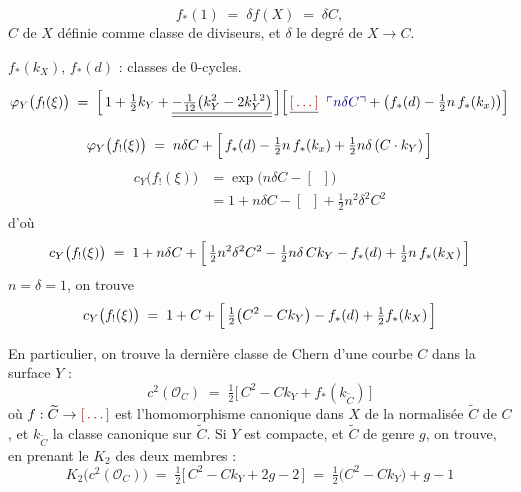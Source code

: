 \documentclass[11pt,a4paper]{article}
\begin{document}
\[
  f_{*}(1) \;=\; \delta f(X) \;=\; \delta C ,
\]
\struck{\ill{}} $C$   de $X$ \ill{} définie
comme classe de diviseurs, et $\delta$ le degré de $X \to C$.

$f_{*}(k_{X})$, $f_{*}(d)$ : classes de $0$-cycles.

\[
  \varphi_{Y}\bigl(f_{!}(\xi)\bigr)
  \;=\; \Bigl[\,1 + \tfrac{1}{2}k_{Y}
        + \struck{\uncertain{-\tfrac{1}{12}\bigl(k_{Y}^{2} - 2k_{Y}^{1\,2}\bigr)}}\,\Bigr]
        \Bigl[\,\struck{\ill{}}\;\; \add{n\delta C}
          + \bigl(f_{*}(d) - \tfrac{1}{2}n\,f_{*}(k_{x})\bigr)\Bigr]
\]
\[
  \varphi_{Y}\bigl(f_{!}(\xi)\bigr) \;=\; n\delta C
  + \Bigl[\,f_{*}(d) - \tfrac{1}{2}n\,f_{*}(k_{x})
    + \tfrac{1}{2}n\delta\,(C\cdot k_{Y})\,\Bigr]
\]
\begin{align*}
  c_{Y}\bigl(f_{!}(\xi)\bigr)
    &= \exp\bigl(n\delta C - [\;\;]\bigr) \\
    &= 1 + n\delta C - [\;\;] + \tfrac{1}{2}n^{2}\delta^{2}C^{2}
\end{align*}
d'où
\[
  c_{Y}\bigl(f_{!}(\xi)\bigr) \;=\; 1 + n\delta C
  + \Bigl[\,\tfrac{1}{2}n^{2}\delta^{2}C^{2}
    - \tfrac{1}{2}n\delta\,C k_{Y} - f_{*}(d)
    + \tfrac{1}{2}n\,f_{*}(k_{X})\,\Bigr]
\]
 $n = \delta = 1$, \struck{\ill{}} on trouve
\[
  c_{Y}\bigl(f_{!}(\xi)\bigr) \;=\; 1 + C
  + \Bigl[\,\tfrac{1}{2}\bigl(C^{2} - C k_{Y}\bigr) - f_{*}(d)
    + \tfrac{1}{2}f_{*}(k_{X})\,\Bigr]
\]

En particulier, on trouve la dernière classe de Chern d'une courbe $C$ dans la
surface $Y$ :
\[
  c^{2}(\mathcal{O}_{C}) \;=\; \tfrac{1}{2}\bigl[\,C^{2} - C k_{Y}
    + f_{*}(k_{\widetilde{C}})\,\bigr]
\]
où $f : \widetilde{C} \to \ill{}$ est l'homomorphisme canonique
dans $X$ de la \struck{\ill{}} normalisée $\widetilde{C}$ de $C$,
et $k_{\widetilde{C}}$ la classe canonique sur $\widetilde{C}$. Si $Y$ est
compacte, et $\widetilde{C}$ de genre $g$, on trouve, en
prenant le $K_{2}$ des deux membres :
\[
  K_{2}\bigl(c^{2}(\mathcal{O}_{C})\bigr)
  \;=\; \tfrac{1}{2}\bigl[\,C^{2} - C k_{Y} + 2g - 2\,\bigr]
  \;=\; \tfrac{1}{2}\bigl(C^{2} - C k_{Y}\bigr) + g - 1
\]
\end{document}
